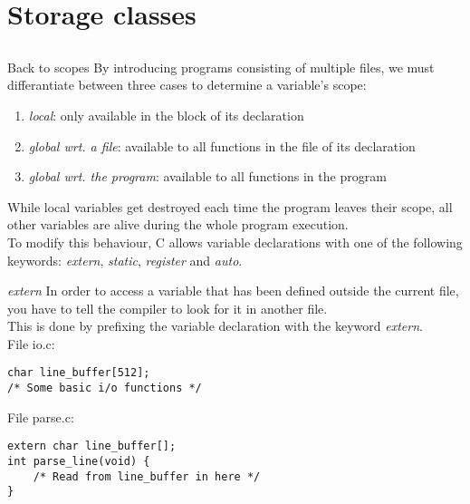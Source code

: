\section{Storage classes}
\subsection{}

\begin{frame}{Back to scopes}
	By introducing programs consisting of multiple files, we must differantiate between three cases to determine a variable's scope:
	\begin{enumerate}
		\item \textit{local}: only available in the block of its declaration
		\item \textit{global wrt. a file}: available to all functions in the file of its declaration
		\item \textit{global wrt. the program}: available to all functions in the program
	\end{enumerate}\bigskip
	While local variables get destroyed each time the program leaves their scope, all other variables are alive during the whole program execution.\\ \bigskip
	To modify this behaviour, C allows variable declarations with one of the following keywords: \textit{extern}, \textit{static}, \textit{register} and \textit{auto}.
\end{frame}

\begin{frame}[fragile]{\textit{extern}}
	In order to access a variable that has been defined outside the current file, you have to tell the compiler to look for it in another file.\\
	This is done by prefixing the variable declaration with the keyword \textit{extern}.\\
	\bigskip
	File io.c:
	\begin{lstlisting}
char line_buffer[512];
/* Some basic i/o functions */
\end{lstlisting}
	File parse.c:
	\begin{lstlisting}
extern char line_buffer[];
int parse_line(void) {
	/* Read from line_buffer in here */
}
\end{lstlisting}

\end{frame}


